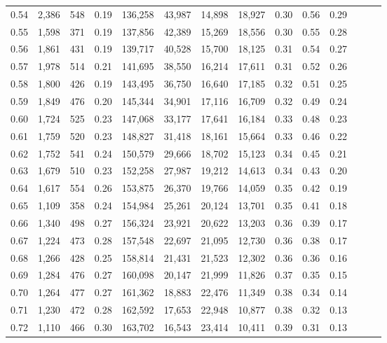 \begin{tabular}{rrrrrrrrrrrrrr}
0.54 &  2,386 &  548 &  0.19 &  136,258 &   43,987 &  14,898 &  18,927 &  0.30 &  0.56 &      0.29 \\
0.55 &  1,598 &  371 &  0.19 &  137,856 &   42,389 &  15,269 &  18,556 &  0.30 &  0.55 &      0.28 \\
0.56 &  1,861 &  431 &  0.19 &  139,717 &   40,528 &  15,700 &  18,125 &  0.31 &  0.54 &      0.27 \\
0.57 &  1,978 &  514 &  0.21 &  141,695 &   38,550 &  16,214 &  17,611 &  0.31 &  0.52 &      0.26 \\
0.58 &  1,800 &  426 &  0.19 &  143,495 &   36,750 &  16,640 &  17,185 &  0.32 &  0.51 &      0.25 \\
0.59 &  1,849 &  476 &  0.20 &  145,344 &   34,901 &  17,116 &  16,709 &  0.32 &  0.49 &      0.24 \\
0.60 &  1,724 &  525 &  0.23 &  147,068 &   33,177 &  17,641 &  16,184 &  0.33 &  0.48 &      0.23 \\
0.61 &  1,759 &  520 &  0.23 &  148,827 &   31,418 &  18,161 &  15,664 &  0.33 &  0.46 &      0.22 \\
0.62 &  1,752 &  541 &  0.24 &  150,579 &   29,666 &  18,702 &  15,123 &  0.34 &  0.45 &      0.21 \\
0.63 &  1,679 &  510 &  0.23 &  152,258 &   27,987 &  19,212 &  14,613 &  0.34 &  0.43 &      0.20 \\
0.64 &  1,617 &  554 &  0.26 &  153,875 &   26,370 &  19,766 &  14,059 &  0.35 &  0.42 &      0.19 \\
0.65 &  1,109 &  358 &  0.24 &  154,984 &   25,261 &  20,124 &  13,701 &  0.35 &  0.41 &      0.18 \\
0.66 &  1,340 &  498 &  0.27 &  156,324 &   23,921 &  20,622 &  13,203 &  0.36 &  0.39 &      0.17 \\
0.67 &  1,224 &  473 &  0.28 &  157,548 &   22,697 &  21,095 &  12,730 &  0.36 &  0.38 &      0.17 \\
0.68 &  1,266 &  428 &  0.25 &  158,814 &   21,431 &  21,523 &  12,302 &  0.36 &  0.36 &      0.16 \\
0.69 &  1,284 &  476 &  0.27 &  160,098 &   20,147 &  21,999 &  11,826 &  0.37 &  0.35 &      0.15 \\
0.70 &  1,264 &  477 &  0.27 &  161,362 &   18,883 &  22,476 &  11,349 &  0.38 &  0.34 &      0.14 \\
0.71 &  1,230 &  472 &  0.28 &  162,592 &   17,653 &  22,948 &  10,877 &  0.38 &  0.32 &      0.13 \\
0.72 &  1,110 &  466 &  0.30 &  163,702 &   16,543 &  23,414 &  10,411 &  0.39 &  0.31 &      0.13 \\

\end{tabular}

